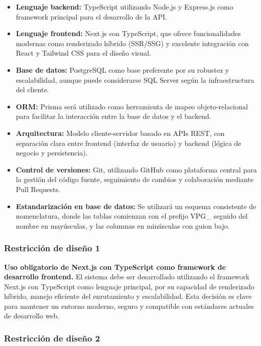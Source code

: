 \begin{itemize}
	\item \textbf{Lenguaje backend:} TypeScript utilizando Node.js y Express.js como framework principal para el desarrollo de la API.
	\item \textbf{Lenguaje frontend:} Next.js con TypeScript, que ofrece funcionalidades modernas como renderizado híbrido (SSR/SSG) y excelente integración con React y Tailwind CSS para el diseño visual.
	\item \textbf{Base de datos:} PostgreSQL como base preferente por su robustez y escalabilidad, aunque puede considerarse SQL Server según la infraestructura del cliente.
	\item \textbf{ORM:} Prisma será utilizado como herramienta de mapeo objeto-relacional para facilitar la interacción entre la base de datos y el backend.
	\item \textbf{Arquitectura:} Modelo cliente-servidor basado en APIs REST, con separación clara entre frontend (interfaz de usuario) y backend (lógica de negocio y persistencia).
	\item \textbf{Control de versiones:} Git, utilizando GitHub como plataforma central para la gestión del código fuente, seguimiento de cambios y colaboración mediante Pull Requests.
	\item \textbf{Estandarización en base de datos:} Se utilizará un esquema consistente de nomenclatura, donde las tablas comienzan con el prefijo VPG\_ seguido del nombre en mayúsculas, y las columnas en minúsculas con guion bajo.
\end{itemize}

\subsubsection*{Restricción de diseño 1}

\textbf{Uso obligatorio de Next.js con TypeScript como framework de desarrollo frontend.}
El sistema debe ser desarrollado utilizando el framework Next.js con TypeScript como lenguaje principal, por su capacidad de renderizado híbrido, manejo eficiente del enrutamiento y escalabilidad. Esta decisión es clave para mantener un entorno moderno, seguro y compatible con estándares actuales de desarrollo web.

\subsubsection*{Restricción de diseño 2}

